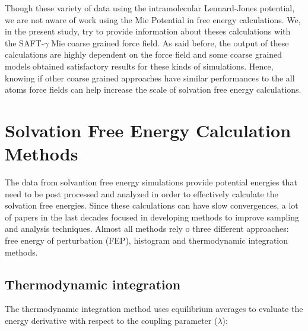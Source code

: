 Though these variety of data using the intramolecular Lennard-Jones potential, we are not aware of work using the Mie Potential in free energy calculations. We, in the present study, try to provide information about theses calculations with the SAFT-$\gamma$ Mie coarse grained force field.  As said before, the output of these calculations are highly dependent on the force field and some coarse grained models obtained satisfactory results for these kinds of simulations. Hence, knowing if other coarse grained approaches have similar performances to the all atoms force fields can help increase the scale of solvation free energy calculations. 

\section{Solvation Free Energy Calculation Methods}

The data from solvantion free energy simulations provide potential energies that need to be post processed and analyzed in order to effectively calculate the solvation free energies. Since these calculations  can have slow convergences, a lot of papers in the last decades focused in developing methods to improve sampling and analysis techniques. Almost all methods rely o three different approaches: free energy of perturbation (FEP), histogram and thermodynamic integration methods.

\subsection{Thermodynamic integration}

The thermodynamic integration method \cite{kirkwood1935} uses equilibrium averages to evaluate the energy derivative with respect to the coupling parameter ($\lambda$): 
%
%
%

